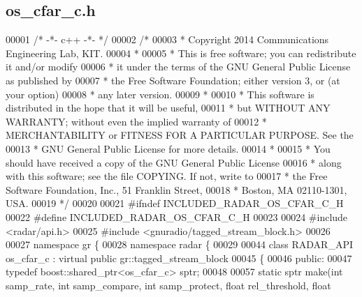 \subsection{os\+\_\+cfar\+\_\+c.\+h}
\label{os__cfar__c_8h_source}

\begin{DoxyCode}
00001 \textcolor{comment}{/* -*- c++ -*- */}
00002 \textcolor{comment}{/* }
00003 \textcolor{comment}{ * Copyright 2014 Communications Engineering Lab, KIT.}
00004 \textcolor{comment}{ * }
00005 \textcolor{comment}{ * This is free software; you can redistribute it and/or modify}
00006 \textcolor{comment}{ * it under the terms of the GNU General Public License as published by}
00007 \textcolor{comment}{ * the Free Software Foundation; either version 3, or (at your option)}
00008 \textcolor{comment}{ * any later version.}
00009 \textcolor{comment}{ * }
00010 \textcolor{comment}{ * This software is distributed in the hope that it will be useful,}
00011 \textcolor{comment}{ * but WITHOUT ANY WARRANTY; without even the implied warranty of}
00012 \textcolor{comment}{ * MERCHANTABILITY or FITNESS FOR A PARTICULAR PURPOSE.  See the}
00013 \textcolor{comment}{ * GNU General Public License for more details.}
00014 \textcolor{comment}{ * }
00015 \textcolor{comment}{ * You should have received a copy of the GNU General Public License}
00016 \textcolor{comment}{ * along with this software; see the file COPYING.  If not, write to}
00017 \textcolor{comment}{ * the Free Software Foundation, Inc., 51 Franklin Street,}
00018 \textcolor{comment}{ * Boston, MA 02110-1301, USA.}
00019 \textcolor{comment}{ */}
00020  
00021 \textcolor{preprocessor}{#ifndef INCLUDED\_RADAR\_OS\_CFAR\_C\_H}
00022 \textcolor{preprocessor}{#define INCLUDED\_RADAR\_OS\_CFAR\_C\_H}
00023 
00024 \textcolor{preprocessor}{#include <radar/api.h>}
00025 \textcolor{preprocessor}{#include <gnuradio/tagged\_stream\_block.h>}
00026 
00027 \textcolor{keyword}{namespace }gr \{
00028   \textcolor{keyword}{namespace }radar \{
00029 
00044     \textcolor{keyword}{class }RADAR_API os_cfar_c : \textcolor{keyword}{virtual} \textcolor{keyword}{public} gr::tagged\_stream\_block
00045     \{
00046      \textcolor{keyword}{public}:
00047       \textcolor{keyword}{typedef} boost::shared\_ptr<os\_cfar\_c> sptr;
00048 
00057       \textcolor{keyword}{static} sptr make(\textcolor{keywordtype}{int} samp_rate, \textcolor{keywordtype}{int} samp\_compare, \textcolor{keywordtype}{int} samp\_protect, \textcolor{keywordtype}{float} rel\_threshold, \textcolor{keywordtype}{float} 

\end{DoxyCode}
